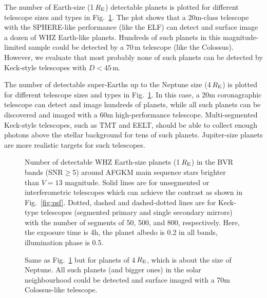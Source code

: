 \documentclass{emulateapj}
\begin{document}
The number of Earth-size (1\,$R_{\rm E}$) detectable planets is plotted for different telescope sizes
and types in Fig.~\ref{fig:npl}. 
The plot shows that a 20m-class telescope with the SPHERE-like performance
(like the ELF) can detect and surface image a dozen of WHZ Earth-like planets.
Hundreds of such planets in this magnitude-limited sample could be detected by a 70\,m
telescope (like the Colossus). 
However, we evaluate that most probably none of such planets can be detected by Keck-style 
telescopes with $D<45$\,m.

The number of detectable super-Earths up to the Neptune size (4\,$R_{\rm E}$) 
is plotted for different telescope sizes and types in Fig.~\ref{fig:npl}.
In this case, a 20m coronagraphic telescope can detect and image hundreds of planets,
while all such planets can be discovered and imaged with a 60m high-performance telescope.
Multi-segmented Keck-style telescopes, such as TMT and EELT, should be able to collect
enough photons above the stellar background for tens of such planets.
Jupiter-size planets are more realistic targets for such telescopes.

\begin{figure}
\centering
{}
\caption{Number of detectable WHZ Earth-size planets (1\,$R_{\rm E}$) in the BVR bands (SNR$\ge$5) 
around AFGKM main sequence stars brighter than $V=13$ magnitude.
Solid lines are for unsegmented or interferometric telescopes
which can achieve the contrast as shown in Fig.~\ref{fig:psf}.
Dotted, dashed and dashed-dotted lines are for Keck-type telescopes
(segmented primary and single secondary mirrors) with the number of segments
of 50, 500, and 800, respectively.
Here, the exposure time is 4h, the planet albedo is 0.2 in all bands, illumination phase is 0.5. 
}
\label{fig:npl}
\end{figure}

\begin{figure}
\centering
{}
\caption{Same as Fig.~\ref{fig:npl} but for planets of 4\,$R_{\rm E}$, which is about the size of Neptune.
All such planets (and bigger ones) in the solar neighbourhood could be detected and surface imaged 
with a 70m Colossus-like telescope.
}
\label{fig:npl4}
\end{figure}
\end{document}

